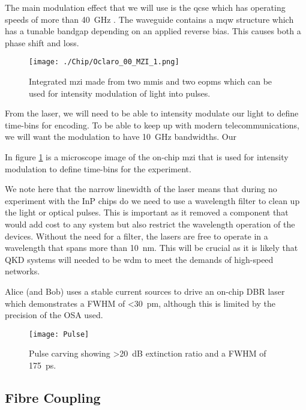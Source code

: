 {The main modulation effect that we will use is the \ac{qcse} which has operating speeds of more than \SI{40}{GHz} \cite{qcse, smit2014}. The waveguide contains a \ac{mqw}  structure which has a tunable bandgap depending on an applied reverse bias. This causes both a phase shift and loss.

\begin{figure}[tbp]
	\texttt{[image: ./Chip/Oclaro\_00\_MZI\_1.png]}
	\caption[Integrated MZI microscope image]{Integrated \acl{mzi} made from two \acsp{mmi} and two \acsp{eopm}  which can be used for intensity modulation of light into pulses.}
	\label{fig:InP_MZI}
\end{figure}

From the laser, we will need to be able to intensity modulate our light to define time-bins for encoding. To be able to keep up with modern telecommunications, we will want the modulation to have \SI{10}{GHz} bandwidths. Our

In figure \ref{fig:InP_MZI} is a microscope image of the on-chip \ac{mzi} that is used for intensity modulation to define time-bins for the experiment.

We note here that the narrow linewidth of the laser means that during no experiment with the \ac{InP} chips do we need to use a wavelength filter to clean up the light or optical pulses. This is important as it removed a component that would add cost to any system but also restrict the wavelength operation of the devices. Without the need for a filter, the lasers are free to operate in a wavelength that spans more than \SI{10}{nm}. This will be crucial as it is likely that \ac{QKD} systems will needed to be \ac{wdm} to meet the demands of high-speed networks.

Alice (and Bob) uses a stable current sources to drive an on-chip \ac{DBR} laser which demonstrates a \ac{FWHM} of \SI{<30}{pm}, although this is limited by the precision of the \ac{OSA} used.

\begin{figure}[tbp]
	\centering
	\texttt{[image: Pulse]}
	\caption[Pulse carving]{Pulse carving showing \SI{>20}{dB} extinction ratio and a \ac{FWHM} of \SI{175}{\ps}.}
	\label{fig:pulses}
\end{figure}

\subsection{Fibre Coupling}

}
